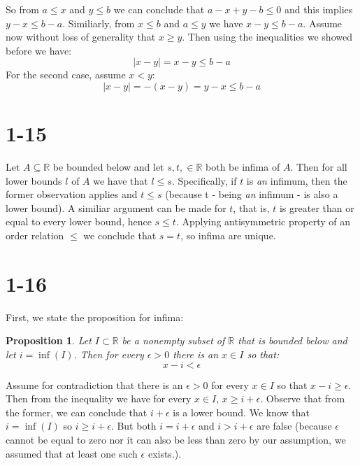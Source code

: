 \documentclass{article}
\newtheorem*{proposition}{Proposition}
\begin{document}
So from \(a \leq x\) and \(y \leq b\) we can conclude that \(a -x + y - b \leq 0\) and this implies \(y - x \leq b - a\).
Similiarly, from  \(x \leq b\) and \(a \leq y\) we have \(x - y \leq b - a\). Assume now without loss of generality that
\(x \geq y\). Then using the inequalities we showed before we have:
\begin{equation*}
    |x - y| = x - y \leq b - a
\end{equation*}
For the second case, assume \(x < y\):
\begin{equation*}
    |x - y| = -(x - y) = y - x \leq b - a
\end{equation*}

\section*{1-15}
Let \(A \subseteq \mathbb{R}\) be bounded below and let \(s, t, \in \mathbb{R}\) both be infima of \(A\). Then for all lower bounds \(l\)
of \(A\) we have that \(l \leq s\). Specifically, if \(t\) is \emph{an} infimum, then the former observation applies and \(t \leq s\) (because t - 
being \emph{an} infimum - is also a lower bound). A similiar argument can be made for \(t\), that is, \(t\) is greater than or equal to
every lower bound, hence \(s \leq t\). Applying antisymmetric property of an order relation \(\leq\) we conclude that
\(s = t\), so infima are unique. 

\section*{1-16}
First, we state the proposition for infima:
\begin{proposition}
    Let \(I \subset \mathbb{R}\) be a nonempty subset of \( \mathbb{R} \) that is bounded below and let \(i =  \inf(I)\).
    Then for every \(\epsilon > 0\) there is an \(x \in I\) so that:
    \begin{equation*}
        x - i < \epsilon
    \end{equation*}
\end{proposition}

Assume for contradiction that there is an \(\epsilon > 0\) for every \(x \in I\) so that \(x - i \geq \epsilon\). Then from the inequality
we have for every \(x \in I\), \(x \geq i + \epsilon\). Observe that from the former, we can conclude that \(i + \epsilon\) is a lower
bound. We know that \(i = \inf(I)\) so \(i \geq i + \epsilon\). But both \(i = i + \epsilon\) and \(i > i + \epsilon\) are false (because
\(\epsilon\) cannot be equal to zero nor it can also be less than zero by our assumption, we assumed that at least one such \(\epsilon\) exists.).
\newline
\end{document}

